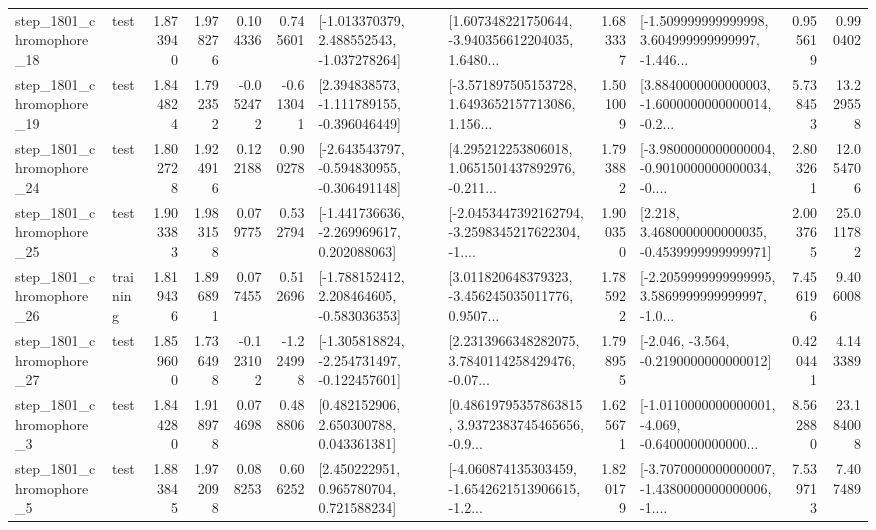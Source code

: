 \begin{tabular}{llrrrrllrlrr}
 step\_1801\_chromophore\_18 &      test &      1.873940 &    1.978276 &      0.104336 &  0.745601 &   [-1.013370379, 2.488552543, -1.037278264] &  [1.607348221750644, -3.940356612204035, 1.6480... &       1.683337 &  [-1.509999999999998, 3.604999999999997, -1.446... &            0.955619 &          0.990402 \\
 step\_1801\_chromophore\_19 &      test &      1.844824 &    1.792352 &     -0.052472 & -0.613041 &   [2.394838573, -1.111789155, -0.396046449] &  [-3.571897505153728, 1.6493652157713086, 1.156... &       1.501009 &  [3.8840000000000003, -1.6000000000000014, -0.2... &            5.738453 &         13.229558 \\
 step\_1801\_chromophore\_24 &      test &      1.802728 &    1.924916 &      0.122188 &  0.900278 &  [-2.643543797, -0.594830955, -0.306491148] &  [4.295212253806018, 1.0651501437892976, -0.211... &       1.793882 &  [-3.9800000000000004, -0.9010000000000034, -0.... &            2.803261 &         12.054706 \\
 step\_1801\_chromophore\_25 &      test &      1.903383 &    1.983158 &      0.079775 &  0.532794 &   [-1.441736636, -2.269969617, 0.202088063] &  [-2.0453447392162794, -3.2598345217622304, -1.... &       1.900350 &   [2.218, 3.4680000000000035, -0.4539999999999971] &            2.003765 &         25.011782 \\
 step\_1801\_chromophore\_26 &  training &      1.819436 &    1.896891 &      0.077455 &  0.512696 &   [-1.788152412, 2.208464605, -0.583036353] &  [3.011820648379323, -3.456245035011776, 0.9507... &       1.785922 &  [-2.2059999999999995, 3.5869999999999997, -1.0... &            7.456196 &          9.406008 \\
 step\_1801\_chromophore\_27 &      test &      1.859600 &    1.736498 &     -0.123102 & -1.224998 &  [-1.305818824, -2.254731497, -0.122457601] &  [2.2313966348282075, 3.7840114258429476, -0.07... &       1.798955 &              [-2.046, -3.564, -0.2190000000000012] &            0.420441 &          4.143389 \\
  step\_1801\_chromophore\_3 &      test &      1.844280 &    1.918978 &      0.074698 &  0.488806 &     [0.482152906, 2.650300788, 0.043361381] &  [0.48619795357863815, 3.9372383745465656, -0.9... &       1.625671 &  [-1.0110000000000001, -4.069, -0.6400000000000... &            8.562880 &         23.184008 \\
  step\_1801\_chromophore\_5 &      test &      1.883845 &    1.972098 &      0.088253 &  0.606252 &     [2.450222951, 0.965780704, 0.721588234] &  [-4.060874135303459, -1.6542621513906615, -1.2... &       1.820179 &  [-3.7070000000000007, -1.4380000000000006, -1.... &            7.539713 &          7.407489 \\

\end{tabular}
